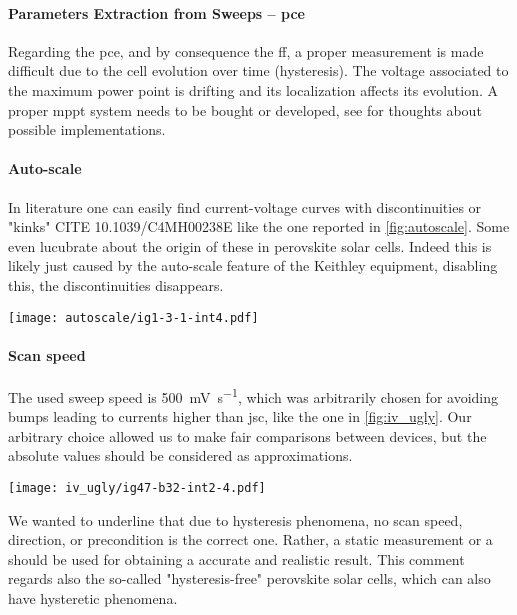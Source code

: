 \paragraph{Parameters Extraction from Sweeps -- \gls{pce}} Regarding the \gls{pce}, and by consequence the \gls{ff}, a proper measurement is made difficult due to the cell evolution over time (hysteresis). The voltage associated to the maximum power point is drifting and its localization affects its evolution. A proper \gls{mppt} system needs to be bought or developed, see  for thoughts about possible implementations.

\paragraph{Auto-scale}\label{autoscale} In literature one can easily find current-voltage curves with discontinuities or "kinks"\cite{Li2016,Snaith2014,Zhang2015} CITE  10.1039/C4MH00238E  like the one reported in \cref{fig:autoscale}. Some even lucubrate about the origin of these in perovskite solar cells. Indeed this is likely just caused by the auto-scale feature of the Keithley equipment, disabling this, the discontinuities disappears.

\begin{SCfigure}%
	\centering
	\texttt{[image: autoscale/ig1-3-1-int4.pdf]}
	\label{fig:autoscale}
\end{SCfigure}

\paragraph{Scan speed} The used sweep speed is \SI{500}{\mV\per\s}, which was arbitrarily chosen for avoiding bumps leading to currents higher than \gls{jsc}, like the one in \cref{fig:iv_ugly}. %
Our arbitrary choice allowed us to make fair comparisons between devices, but the absolute values should be considered as approximations.
\begin{SCfigure}%
	\centering
	\texttt{[image: iv\_ugly/ig47-b32-int2-4.pdf]}
	\label{fig:iv_ugly}
\end{SCfigure}
We wanted to underline that due to hysteresis phenomena, no scan speed, direction, or precondition is the correct one.  %
Rather, a static measurement or a  should be used for obtaining a accurate and realistic result.
This comment regards also the so-called "hysteresis-free" perovskite solar cells, which can also have hysteretic phenomena\cite{Jacobs2018}. 

